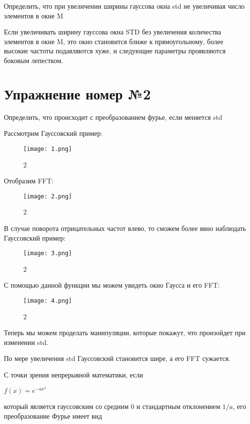 \documentclass[10pt,a4paper,oneside]{article}
\begin{document}
Определить, что при увеличении ширины гауссова окна std не увеличивая число элементов в окне M

Если увеличивать ширину гауссова окна STD без увеличения количества элементов в окне M, это окно становится ближе к прямоугольному, более высокие частоты подавляются хуже, и следующие параметры проявляются боковым лепестком.

\section{Упражнение номер №2}

Определить, что происходит с преобразованием фурье, если меняется std

Рассмотрим Гауссовский пример:

\begin{figure}[H]
        \centering
        \texttt{[image: 1.png]}
        \caption{2}
        \label{fig:first}
\end{figure}

Отобразим FFT:

\begin{figure}[H]
        \centering
        \texttt{[image: 2.png]}
        \caption{2}
        \label{fig:first}
\end{figure}

В случае поворота отрицательных частот влево, то сможем более явно наблюдать Гауссовский пример:

\begin{figure}[H]
        \centering
        \texttt{[image: 3.png]}
        \caption{2}
        \label{fig:first}
\end{figure}

С помощью данной функции мы можем увидеть окно Гаусса и его FFT:

\begin{figure}[H]
        \centering
        \texttt{[image: 4.png]}
        \caption{2}
        \label{fig:first}
\end{figure}

Теперь мы можем проделать манипуляции, которые покажут, что произойдет при изменении std.

По мере увеличения std  Гауссовский становится шире, а его FFT сужается.

С точки зрения непрерывной математики, если

$f(x) = e^{-a x^2}$

который является гауссовским со средним 0 и стандартным отклонением $1/a$, его преобразование Фурье имеет вид
\end{document}
